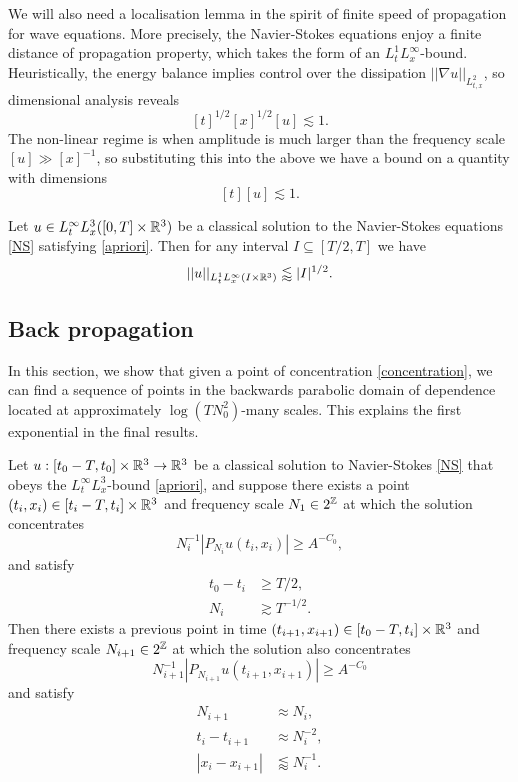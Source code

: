 We will also need a localisation lemma in the spirit of finite speed of propagation for wave equations. More precisely, the Navier-Stokes equations enjoy a finite distance of propagation property, which takes the form of an $L^1_tL^\infty_x$-bound. Heuristically, the energy balance implies control over the dissipation $||\nabla u||_{L^2_{t, x}}$, so dimensional analysis reveals
	\[
		[t]^{1/2} [x]^{1/2} [u] \lesssim 1.
	\]
The non-linear regime is when amplitude is much larger than the frequency scale $[u] \gg [x]^{-1}$, so substituting this into the above we have a bound on a quantity with dimensions
	\[
		[t] [u] \lesssim 1.
	\]

\begin{proposition}
	Let $u \in L^\infty_t L^3_x ([0, T] \times \mathbb R^3)$ be a classical solution to the Navier-Stokes equations \eqref{NS} satisfying \eqref{apriori}. Then for any interval $I \subseteq [T/2, T]$ we have
		\begin{equation}
			||u||_{L^1_t L^\infty_x (I \times \mathbb R^3)} \lessapprox |I|^{1/2}.\label{eq:dist}
		\end{equation}
\end{proposition}

\subsection{Back propagation}

In this section, we show that given a point of concentration \eqref{concentration}, we can find a sequence of points in the backwards parabolic domain of dependence located at approximately  $\log(T N_0^2)$-many scales. This explains the first exponential in the final results. 

\begin{lemma} \label{lem:back}
	Let $u: [t_0 - T, t_0] \times \mathbb R^3 \to \mathbb R^3$ be a classical solution to Navier-Stokes \eqref{NS} that obeys the $L^\infty_t L^3_x$-bound \eqref{apriori}, and suppose there exists a point $(t_i, x_i) \in [t_i - T, t_i] \times \mathbb R^3$ and frequency scale $N_1 \in 2^\mathbb Z$ at which the solution concentrates
		\[
			N_i^{-1} |P_{N_i} u (t_i, x_i)|
				\geq A^{-C_0},
		\]
	and satisfy
		\begin{align*}
			t_0 - t_i
				&\geq T/2, \\
			N_i
				&\gtrsim T^{-1/2}.	
		\end{align*}	
	Then there exists a previous point in time $(t_{i + 1}, x_{i + 1}) \in [t_0 - T, t_i] \times \mathbb R^3$ and frequency scale $N_{i + 1} \in 2^\mathbb Z$ at which the solution also concentrates
		\[
			N_{i + 1}^{-1} |P_{N_{i + 1}} u (t_{i + 1}, x_{i + 1})|
				\geq A^{-C_0}
		\]
	and satisfy
		\begin{align*}
			N_{i + 1}
				&\approx N_i,\\
			t_i - t_{i + 1}
				&\approx N_i^{-2},\\
			|x_{i} - x_{i + 1}|
				&\lessapprox N_i^{-1}.
		\end{align*}	
\end{lemma}

